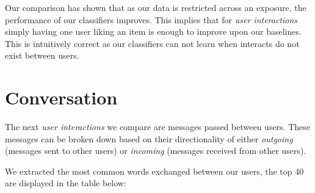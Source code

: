 Our comparison has shown that as our data is restricted across an exposure, the performance of our classifiers improves.
This implies that for \emph{user interactions} simply having one user liking an item is enough to improve upon our baselines. 
This is intuitively correct as our classifiers can not learn when interacts do not exist between users.

\section{Conversation}
\label{sec:groups}

The next \emph{user interactions} we compare are messages passed between users. These messages can be broken down based on their 
directionality of either \emph{outgoing} (messages sent to other users) or 
\emph{incoming} (messages received from other users).

We extracted the most common words exchanged between our users, the top 40 are displayed in the table below:

